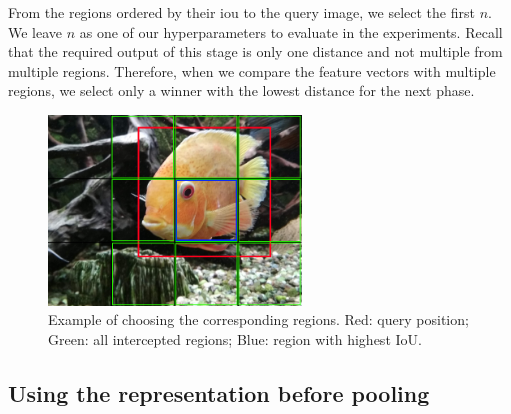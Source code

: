 From the regions ordered by their \acrshort{iou} to the query image, we select the first $n$. We leave $n$ as one of our hyperparameters to evaluate in the experiments. Recall that the required output of this stage is only one distance and not multiple from multiple regions. Therefore, when we compare the feature vectors with multiple regions, we select only a winner with the lowest distance for the next phase. 


\begin{figure}
\centering
\includegraphics[width=0.6\textwidth]{img/fish_grid_regions}
\caption{Example of choosing the corresponding regions. Red: query position; Green: all intercepted regions; Blue: region with highest IoU.}
\label{fig:fish_with_grid}
\end{figure}



\subsection{Using the representation before pooling}

